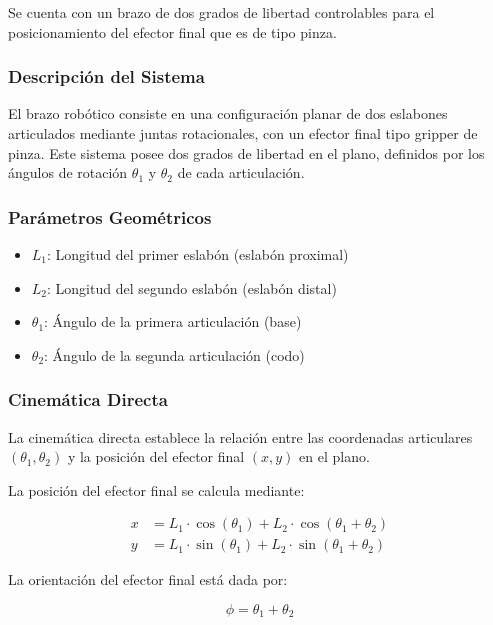 Se cuenta con un brazo de dos grados de libertad controlables para el posicionamiento del efector final que es de tipo pinza.

\subsubsection{Descripción del Sistema}

El brazo robótico consiste en una configuración planar de dos eslabones articulados mediante juntas rotacionales, con un efector final tipo gripper de pinza. Este sistema posee dos grados de libertad en el plano, definidos por los ángulos de rotación $\theta_1$ y $\theta_2$ de cada articulación.

\subsubsection{Parámetros Geométricos}

\begin{itemize}
    \item $L_1$: Longitud del primer eslabón (eslabón proximal)
    \item $L_2$: Longitud del segundo eslabón (eslabón distal)
    \item $\theta_1$: Ángulo de la primera articulación (base)
    \item $\theta_2$: Ángulo de la segunda articulación (codo)
\end{itemize}

\subsubsection{Cinemática Directa}

La cinemática directa establece la relación entre las coordenadas articulares $(\theta_1, \theta_2)$ y la posición del efector final $(x, y)$ en el plano.

La posición del efector final se calcula mediante:

\begin{align}
    x &= L_1 \cdot \cos(\theta_1) + L_2 \cdot \cos(\theta_1 + \theta_2) \\
    y &= L_1 \cdot \sin(\theta_1) + L_2 \cdot \sin(\theta_1 + \theta_2)
\end{align}

La orientación del efector final está dada por:

\begin{equation}
    \phi = \theta_1 + \theta_2
\end{equation}

